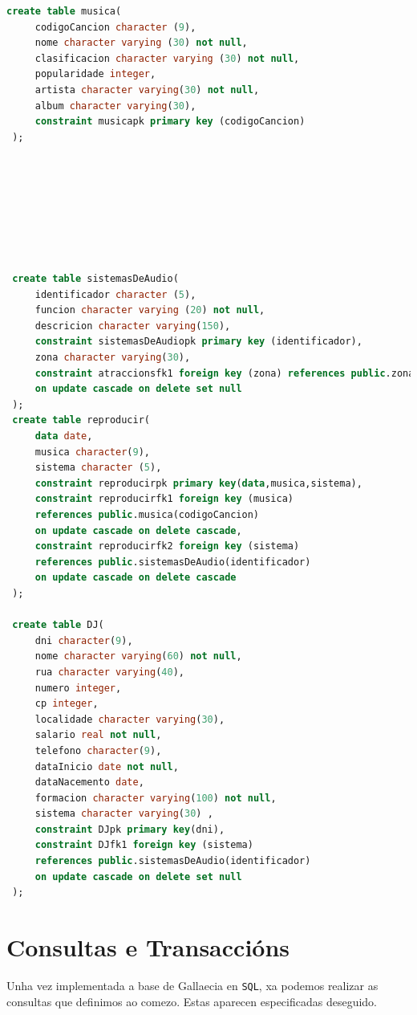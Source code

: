 \documentclass[12pt,a4paper]{book}
\theoremstyle{definition}
\theoremstyle{break}
\begin{document}
\begin{lstlisting}[language=sql,style=sql,tabsize=5,  escapechar={|},
		keywordstyle=\color{blue}\ttfamily,
		stringstyle=\color{red}\ttfamily]
 create table musica(
	 codigoCancion character (9),
	 nome character varying (30) not null,
	 clasificacion character varying (30) not null,
	 popularidade integer,
	 artista character varying(30) not null,
	 album character varying(30),
	 constraint musicapk primary key (codigoCancion)
 );
 
 
 
 
 
 
 
 
 create table sistemasDeAudio(
	 identificador character (5),
	 funcion character varying (20) not null,
	 descricion character varying(150),
	 constraint sistemasDeAudiopk primary key (identificador),
	 zona character varying(30),
	 constraint atraccionsfk1 foreign key (zona) references public.zonas(nome)
	 on update cascade on delete set null
 );
 create table reproducir(
	 data date,
	 musica character(9),
	 sistema character (5),
	 constraint reproducirpk primary key(data,musica,sistema),
	 constraint reproducirfk1 foreign key (musica)
	 references public.musica(codigoCancion)
	 on update cascade on delete cascade,
	 constraint reproducirfk2 foreign key (sistema)
	 references public.sistemasDeAudio(identificador)
	 on update cascade on delete cascade
 );
 
 create table DJ(
	 dni character(9),
	 nome character varying(60) not null,
	 rua character varying(40),
	 numero integer,
	 cp integer,
	 localidade character varying(30),
	 salario real not null,
	 telefono character(9),
	 dataInicio date not null,
	 dataNacemento date,
	 formacion character varying(100) not null,
	 sistema character varying(30) ,
	 constraint DJpk primary key(dni),
	 constraint DJfk1 foreign key (sistema)
	 references public.sistemasDeAudio(identificador)
	 on update cascade on delete set null
 );
	\end{lstlisting}
	
	\section{Consultas e Transaccións}
	Unha vez implementada a base de {\logo Gallaecia} en \texttt{SQL}, xa podemos realizar as consultas que definimos ao comezo. Estas aparecen especificadas deseguido.
	
\end{document}
